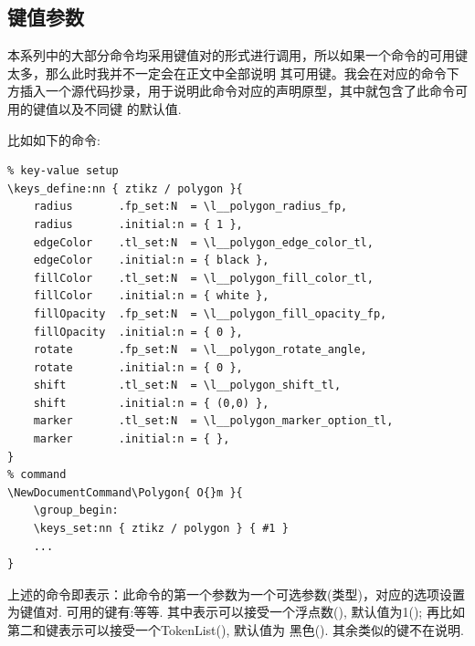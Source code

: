 \subsection{键值参数}
本系列中的大部分命令均采用键值对的形式进行调用，所以如果一个命令的可用键太多，那么此时我并不一定会在正文中全部说明
其可用键。我会在对应的命令下方插入一个源代码抄录，用于说明此命令对应的声明原型，其中就包含了此命令可用的键值以及不同键
的默认值.

比如如下的命令:
\begin{verbatim}
% key-value setup
\keys_define:nn { ztikz / polygon }{
    radius       .fp_set:N  = \l__polygon_radius_fp,
    radius       .initial:n = { 1 },
    edgeColor    .tl_set:N  = \l__polygon_edge_color_tl,
    edgeColor    .initial:n = { black },
    fillColor    .tl_set:N  = \l__polygon_fill_color_tl,
    fillColor    .initial:n = { white },
    fillOpacity  .fp_set:N  = \l__polygon_fill_opacity_fp,
    fillOpacity  .initial:n = { 0 },
    rotate       .fp_set:N  = \l__polygon_rotate_angle,
    rotate       .initial:n = { 0 },
    shift        .tl_set:N  = \l__polygon_shift_tl,
    shift        .initial:n = { (0,0) },
    marker       .tl_set:N  = \l__polygon_marker_option_tl,
    marker       .initial:n = { },
}
% command
\NewDocumentCommand\Polygon{ O{}m }{
    \group_begin:
    \keys_set:nn { ztikz / polygon } { #1 }
    ... 
}
\end{verbatim}

上述的\cmd{\Polygon}命令即表示：此命令的第一个参数为一个可选参数(类型)，对应的选项设置为键值对.
可用的键有:等等. 
其中表示可以接受一个浮点数(), 默认值为1(); 
再比如第二和键表示可以接受一个TokenList(), 默认值为
黑色(). 其余类似的键不在说明.